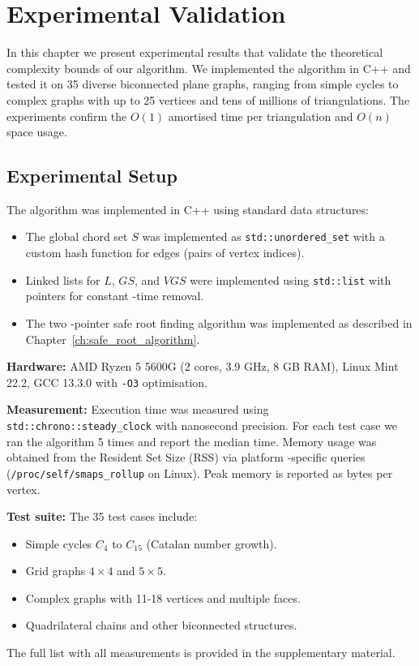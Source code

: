 
\chapter{Experimental Validation}
\label{ch:experiments}

In this chapter we present experimental results that validate the theoretical complexity bounds of our algorithm. 
We implemented the algorithm in C++ and tested it on 35 diverse biconnected plane graphs, ranging from simple cycles to complex graphs with up to 25 vertices and tens of millions of triangulations. 
The experiments confirm the \(O(1)\) amortised time per triangulation and \(O(n)\) space usage.

\section{Experimental Setup}
\label{sec:setup}

The algorithm was implemented in C++ using standard data structures:
\begin{itemize}
    \item The global chord set \(S\) was implemented as \texttt{std::unordered\_set} with a custom hash function for edges (pairs of vertex indices).
    \item Linked lists for \(L\), \(GS\), and \(VGS\) were implemented using \texttt{std::list} with pointers for constant -time removal.
    \item The two -pointer safe root finding algorithm was implemented as described in Chapter~\ref{ch:safe_root_algorithm}.
\end{itemize}

\textbf{Hardware:} AMD Ryzen 5 5600G (2 cores, 3.9 GHz, 8 GB RAM), Linux Mint 22.2, GCC 13.3.0 with \texttt{-O3} optimisation.

\textbf{Measurement:} Execution time was measured using \texttt{std::chrono::steady\_clock} with nanosecond precision. 
For each test case we ran the algorithm 5 times and report the median time. 
Memory usage was obtained from the Resident Set Size (RSS) via platform -specific queries (\texttt{/proc/self/smaps\_rollup} on Linux). 
Peak memory is reported as bytes per vertex.

\textbf{Test suite:} The 35 test cases include:
\begin{itemize}
    \item Simple cycles \(C_4\) to \(C_{15}\) (Catalan number growth).
    \item Grid graphs \(4\times4\) and \(5\times5\).
    \item Complex graphs with 11-18 vertices and multiple faces.
    \item Quadrilateral chains and other biconnected structures.
\end{itemize}
The full list with all measurements is provided in the supplementary material.

